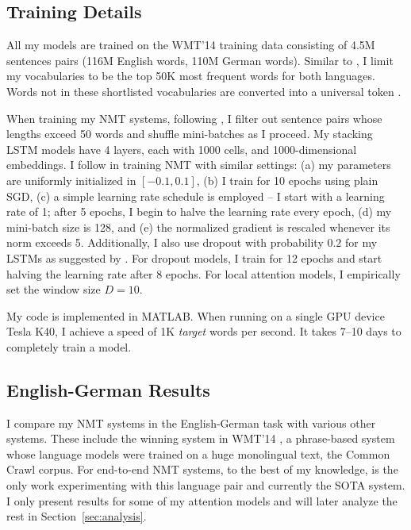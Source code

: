 \subsection{Training Details}
All my models are trained on the WMT'14 training data consisting of 4.5M
sentences pairs (116M English words, 110M German words). Similar to \cite{jean15}, I limit my vocabularies to be the top 50K most frequent words for both languages. Words not in these shortlisted vocabularies are converted into a universal token \unk{}. 

When training my NMT systems, following \cite{bog15,jean15}, I filter out
sentence pairs whose lengths exceed 50 words and shuffle mini-batches as I
proceed. My stacking LSTM models have 4 layers, each with 1000 cells, and
1000-dimensional embeddings. I follow \cite{sutskever14,luong15} in training
NMT with similar settings: (a) my parameters are uniformly initialized in
$[-0.1, 0.1]$, (b) I train for 10 epochs using plain SGD, (c) a simple learning
rate schedule is employed -- I start with a learning rate of 1; after 5 epochs,
I begin to halve the learning rate every epoch, (d) my mini-batch size is 128,
and (e) the normalized gradient is rescaled whenever its norm exceeds 5.
Additionally, I also use dropout with probability $0.2$ for my LSTMs as suggested by
\cite{zaremba14}. For dropout models, I train for 12 epochs and start halving
the learning rate after 8 epochs. For local
attention models, I empirically set the window size $D=10$.

My code is implemented in MATLAB. %
When running on a single GPU device Tesla K40, I achieve a speed of 1K {\it
target} words per second. It takes 7--10 days to completely train a model.

\subsection{English-German Results}
I compare my NMT systems in the English-German task with various other
systems. These include the winning system in WMT'14
\cite{buck14}, a phrase-based system whose language models were trained on a
huge monolingual text, the Common Crawl corpus. For end-to-end NMT systems, to the best of my knowledge, \cite{jean15} is the only work experimenting with this language pair and currently the SOTA system.
I only present results for some of my attention models and will later
analyze the rest in Section~\ref{sec:analysis}. 

